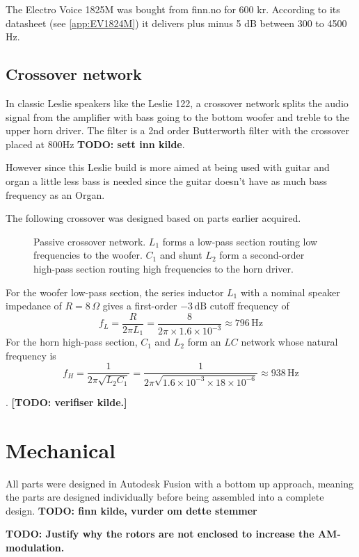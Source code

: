 The Electro Voice 1825M was bought from finn.no for 600 kr. According to its datasheet (see \autoref{app:EV1824M}) it delivers
plus minus 5 dB between 300 to 4500 Hz.

\subsection{Crossover network}
In classic Leslie speakers like the Leslie 122, a crossover network splits the audio signal from the amplifier with bass going to the bottom woofer and treble to the upper horn driver. The filter is a 2nd order Butterworth filter with the crossover placed at 800Hz \textbf{TODO: sett inn kilde}.

However since this Leslie build is more aimed at being used with guitar and organ a little less bass is needed since the guitar doesn't have as much bass frequency as an Organ.

The following crossover was designed based on parts earlier acquired.

\begin{figure}[H]
	\centering
	
	\caption{Passive crossover network. $L_1$ forms a low-pass section routing low frequencies to the woofer. $C_1$ and shunt $L_2$ form a second-order high-pass section routing high frequencies to the horn driver.}
	\label{fig:crossover}
\end{figure}

For the woofer low-pass section, the series inductor $L_1$ with a nominal speaker impedance of $R = 8\,\Omega$ gives a first-order $-3\,\text{dB}$ cutoff frequency of
\[
	f_L = \frac{R}{2\pi L_1} = \frac{8}{2\pi \times 1.6 \times 10^{-3}} \approx 796\,\text{Hz}
\]
For the horn high-pass section, $C_1$ and $L_2$ form an $LC$ network whose natural frequency is
\[
	f_H = \frac{1}{2\pi\sqrt{L_2 C_1}} = \frac{1}{2\pi\sqrt{1.6\times10^{-3} \times 18\times10^{-6}}} \approx 938\,\text{Hz}
\]

\citep{dickason_loudspeaker_cookbook}. \textbf{[TODO: verifiser kilde.]}

\clearpage
\section{Mechanical}
All parts were designed in Autodesk Fusion with a bottom up approach, meaning the parts are designed individually before being assembled into a complete design. \textbf{TODO: finn kilde, vurder om dette stemmer}


\textbf{TODO: Justify why the rotors are not enclosed to increase the AM-modulation.}


